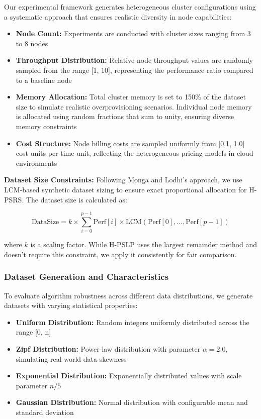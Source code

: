 \documentclass[]{interact}
\theoremstyle{plain}
\theoremstyle{definition}
\theoremstyle{remark}
\begin{document}
Our experimental framework generates heterogeneous cluster configurations using a systematic approach that ensures realistic diversity in node capabilities:

\begin{itemize}
\item \textbf{Node Count:} Experiments are conducted with cluster sizes ranging from 3 to 8 nodes
\item \textbf{Throughput Distribution:} Relative node throughput values are randomly sampled from the range [1, 10], representing the performance ratio compared to a baseline node
\item \textbf{Memory Allocation:} Total cluster memory is set to 150\% of the dataset size to simulate realistic overprovisioning scenarios. Individual node memory is allocated using random fractions that sum to unity, ensuring diverse memory constraints
\item \textbf{Cost Structure:} Node billing costs are sampled uniformly from [0.1, 1.0] cost units per time unit, reflecting the heterogeneous pricing models in cloud environments
\end{itemize}

\textbf{Dataset Size Constraints:}
Following Monga and Lodhi's approach, we use LCM-based synthetic dataset sizing to ensure exact proportional allocation for H-PSRS. The dataset size is calculated as:

\begin{equation}
\text{DataSize} = k \times \sum_{i=0}^{p-1} \text{Perf}[i] \times \text{LCM}(\text{Perf}[0], \ldots, \text{Perf}[p-1])
\end{equation}

where $k$ is a scaling factor. While H-PSLP uses the largest remainder method and doesn't require this constraint, we apply it consistently for fair comparison.

\subsubsection{Dataset Generation and Characteristics}

To evaluate algorithm robustness across different data distributions, we generate datasets with varying statistical properties:

\begin{itemize}
\item \textbf{Uniform Distribution:} Random integers uniformly distributed across the range [0, n]
\item \textbf{Zipf Distribution:} Power-law distribution with parameter $\alpha = 2.0$, simulating real-world data skewness
\item \textbf{Exponential Distribution:} Exponentially distributed values with scale parameter $n/5$
\item \textbf{Gaussian Distribution:} Normal distribution with configurable mean and standard deviation
\end{itemize}
\end{document}
